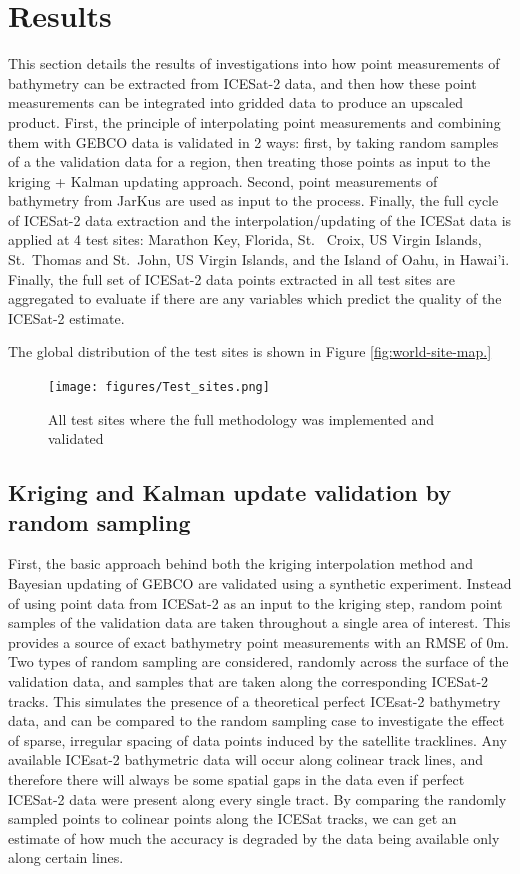 
\chapter{Results}

This section details the results of investigations into how point measurements of bathymetry can be extracted from ICESat-2 data, and then how these point measurements can be integrated into gridded data to produce an upscaled product. First, the principle of interpolating point measurements and combining them with GEBCO data is validated in 2 ways: first, by taking random samples of a the validation data for a region, then treating those points as input to the kriging + Kalman updating approach. Second, point measurements of bathymetry from JarKus are used as input to the process. Finally, the full cycle of ICESat-2 data extraction and the interpolation/updating of the ICESat data is applied at 4 test sites: Marathon Key, Florida, St.~ Croix, US Virgin Islands, St.~Thomas and St.~John, US Virgin Islands, and the Island of Oahu, in Hawai'i. Finally, the full set of ICESat-2 data points extracted in all test sites are aggregated to evaluate if there are any variables which predict the quality of the ICESat-2 estimate.

The global distribution of the test sites is shown in Figure \ref{fig:world-site-map.}

\begin{figure}[!ht]
    \centering
    \texttt{[image: figures/Test\_sites.png]}
    \caption{All test sites where the full methodology was implemented and validated}
    \label{fig:world-site-map}
\end{figure}

\section{Kriging and Kalman update validation by random sampling}

First, the basic approach behind both the kriging interpolation method and Bayesian updating of GEBCO are validated using a synthetic experiment. Instead of using point data from ICESat-2 as an input to the kriging step, random point samples of the validation data are taken throughout a single area of interest. This provides a source of exact bathymetry point measurements with an RMSE of 0m. Two types of random sampling are considered, randomly across the surface of the validation data, and samples that are taken along the corresponding ICESat-2 tracks. This simulates the presence of a theoretical perfect ICEsat-2 bathymetry data, and can be compared to the random sampling case to investigate the effect of sparse, irregular spacing of data points induced by the satellite tracklines. Any available ICEsat-2 bathymetric data will occur along colinear track lines, and therefore there will always be some spatial gaps in the data even if perfect ICESat-2 data were present along every single tract. By comparing the randomly sampled points to colinear points along the ICESat tracks, we can get an estimate of how much the accuracy is degraded by the data being available only along certain lines.

